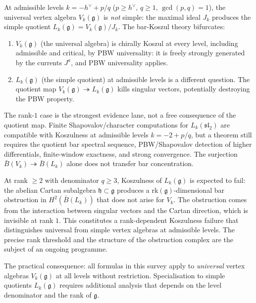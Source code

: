 \documentclass[11pt,reqno]{amsart}
\theoremstyle{definition}
\theoremstyle{remark}
\providecommand{\barB}{\bar{B}}
\providecommand{\fg}{\mathfrak{g}}
\providecommand{\fh}{\mathfrak{h}}
\numberwithin{equation}{section}
\begin{document}
At admissible levels $k = -h^\vee + p/q$ ($p \ge h^\vee$,
$q \ge 1$, $\gcd(p,q) = 1$), the universal vertex algebra
$V_k(\fg)$ is \emph{not} simple: the maximal ideal $J_k$
produces the simple quotient $L_k(\fg) = V_k(\fg)/J_k$. The
bar-Koszul theory bifurcates:
\begin{enumerate}[label=(\roman*),nosep]
\item $V_k(\fg)$ (the universal algebra) is chirally Koszul
at every level, including admissible and critical, by PBW
universality: it is freely strongly generated by the
currents $J^a$, and PBW universality applies.
\item $L_k(\fg)$ (the simple quotient) at admissible levels
is a different question. The quotient map
$V_k(\fg) \twoheadrightarrow L_k(\fg)$ kills singular vectors,
potentially destroying the PBW property.
\end{enumerate}

The rank-$1$ case is the strongest evidence lane, not a free
consequence of the quotient map. Finite Shapovalov/character
computations for $L_k(\mathfrak{sl}_2)$ are compatible with
Koszulness at admissible levels $k = -2 + p/q$, but a theorem still
requires the quotient bar spectral sequence, PBW/Shapovalov detection
of higher differentials, finite-window exactness, and strong
convergence. The surjection
$\barB(V_k) \twoheadrightarrow \barB(L_k)$ alone does not transfer
bar concentration.

At rank $\ge 2$ with denominator $q \ge 3$, Koszulness of
$L_k(\fg)$ is expected to fail: the abelian Cartan subalgebra
$\fh \subset \fg$ produces a $\mathrm{rk}(\fg)$-dimensional bar
obstruction in $H^2(\barB(L_k))$ that does not arise for $V_k$.
The obstruction comes from the interaction between singular
vectors and the Cartan direction, which is invisible at rank $1$.
This constitutes a rank-dependent Koszulness failure that
distinguishes universal from simple vertex algebras at
admissible levels. The precise rank threshold and the structure of
the obstruction complex are the subject of an ongoing programme.

The practical consequence: all formulas in this survey apply to
\emph{universal} vertex algebras $V_k(\fg)$ at all levels without
restriction. Specialisation to simple quotients $L_k(\fg)$
requires additional analysis that depends on the level denominator
and the rank of $\fg$.

\end{document}
